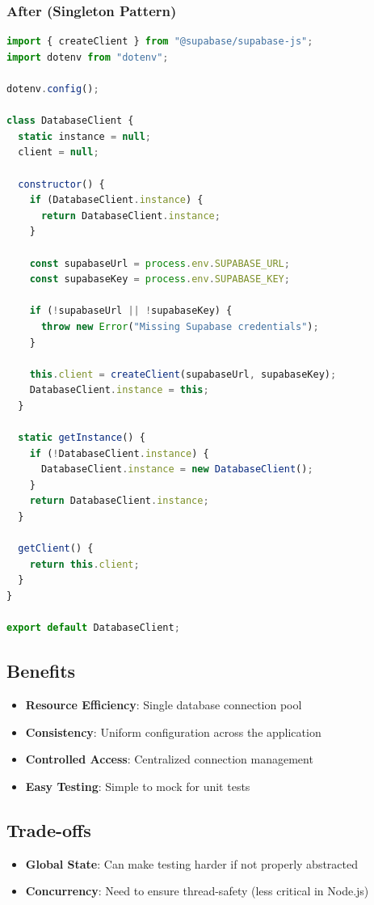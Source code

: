 \documentclass[12pt,a4paper]{article}
\begin{document}
\subsubsection{After (Singleton Pattern)}
\begin{lstlisting}[language=JavaScript, caption=Refactored DatabaseClient.js]
import { createClient } from "@supabase/supabase-js";
import dotenv from "dotenv";

dotenv.config();

class DatabaseClient {
  static instance = null;
  client = null;

  constructor() {
    if (DatabaseClient.instance) {
      return DatabaseClient.instance;
    }
    
    const supabaseUrl = process.env.SUPABASE_URL;
    const supabaseKey = process.env.SUPABASE_KEY;
    
    if (!supabaseUrl || !supabaseKey) {
      throw new Error("Missing Supabase credentials");
    }
    
    this.client = createClient(supabaseUrl, supabaseKey);
    DatabaseClient.instance = this;
  }

  static getInstance() {
    if (!DatabaseClient.instance) {
      DatabaseClient.instance = new DatabaseClient();
    }
    return DatabaseClient.instance;
  }

  getClient() {
    return this.client;
  }
}

export default DatabaseClient;
\end{lstlisting}

\subsection{Benefits}
\begin{itemize}
    \item \textbf{Resource Efficiency}: Single database connection pool
    \item \textbf{Consistency}: Uniform configuration across the application
    \item \textbf{Controlled Access}: Centralized connection management
    \item \textbf{Easy Testing}: Simple to mock for unit tests
\end{itemize}

\subsection{Trade-offs}
\begin{itemize}
    \item \textbf{Global State}: Can make testing harder if not properly abstracted
    \item \textbf{Concurrency}: Need to ensure thread-safety (less critical in Node.js)
\end{itemize}
\end{document}
